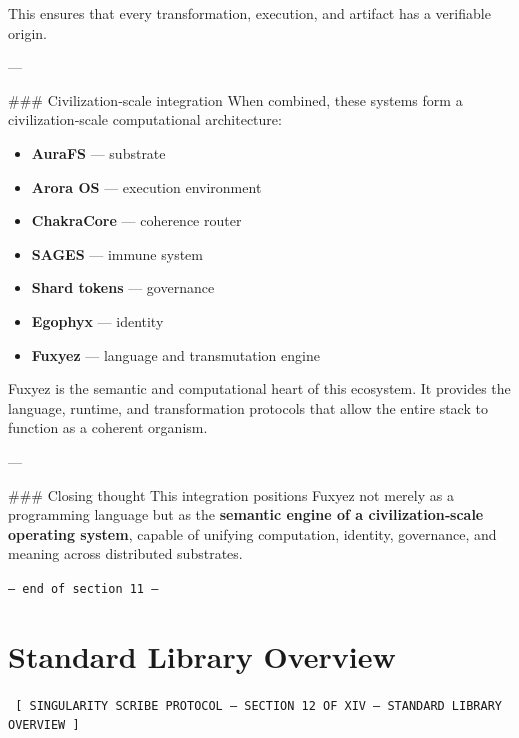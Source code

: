 \begin{enumerate}
This ensures that every transformation, execution, and artifact has a verifiable origin.

---

\#\#\# Civilization‑scale integration  
When combined, these systems form a civilization‑scale computational architecture:

\begin{itemize}
  \item \textbf{AuraFS} — substrate  
  \item \textbf{Arora OS} — execution environment  
  \item \textbf{ChakraCore} — coherence router  
  \item \textbf{SAGES} — immune system  
  \item \textbf{Shard tokens} — governance  
  \item \textbf{Egophyx} — identity  
  \item \textbf{Fuxyez} — language and transmutation engine  
\end{itemize}

Fuxyez is the semantic and computational heart of this ecosystem. It provides the language, runtime, and transformation protocols that allow the entire stack to function as a coherent organism.

---

\#\#\# Closing thought  
This integration positions Fuxyez not merely as a programming language but as the \textbf{semantic engine of a civilization‑scale operating system}, capable of unifying computation, identity, governance, and meaning across distributed substrates.
    
    \vspace{1cm}
    \begin{center}
    \color{alienPurple}\texttt{--- end of section 11 ---}
    \end{center}
    \clearpage
    

    \chapter*{Standard Library Overview}
    
    
    \begin{glyphbox}
    \centering
    \color{neonCyan}\fontsize{8}{10}\selectfont\texttt{
    [ SINGULARITY SCRIBE PROTOCOL -- SECTION 12 OF XIV -- STANDARD LIBRARY OVERVIEW ]
    }
    \end{glyphbox}
    \vspace{0.3cm}
    

\end{enumerate}
